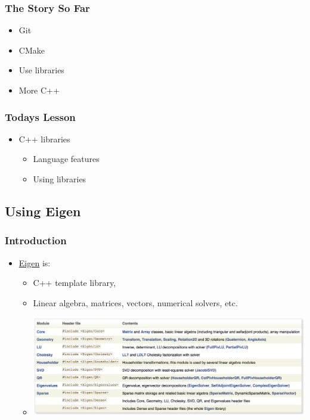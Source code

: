 \subsubsection{The Story So Far}\label{the-story-so-far-1}

\begin{itemize}
\itemsep1pt\parskip0pt
\item
  Git
\item
  CMake
\item
  Use libraries
\item
  More C++
\end{itemize}

\subsubsection{Todays Lesson}\label{todays-lesson-2}

\begin{itemize}
\itemsep1pt\parskip0pt
\item
  C++ libraries

  \begin{itemize}
  \itemsep1pt\parskip0pt
  \item
    Language features
  \item
    Using libraries
  \end{itemize}
\end{itemize}

\subsection{Using Eigen}\label{using-eigen}

\subsubsection{Introduction}\label{introduction}

\begin{itemize}
\itemsep1pt\parskip0pt
\item
  \href{http://eigen.tuxfamily.org}{Eigen} is:

  \begin{itemize}
  \itemsep1pt\parskip0pt
  \item
    C++ template library,
  \item
    Linear algebra, matrices, vectors, numerical solvers, etc.
  \item
    \includegraphics{03cpplibraries/figures/eigenContents.png}
  \end{itemize}
\end{itemize}

